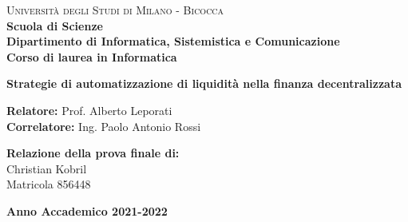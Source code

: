 \documentclass[12pt,a4paper]{report}
\begin{document}
\begin{titlepage}
        
        \noindent
        \begin{minipage}[t]{0.19\textwidth}
        \end{minipage}
        \begin{minipage}[t]{0.81\textwidth}
        {
                {\textsc{Università degli Studi di Milano - Bicocca}} \\
                \textbf{Scuola di Scienze} \\
                \textbf{Dipartimento di Informatica, Sistemistica e Comunicazione} \\
                \textbf{Corso di laurea in Informatica} \\
                \par
        }
        \end{minipage}
        
	\vspace{40mm}
        
	\begin{center}
            {\LARGE{
                    \textbf{Strategie di automatizzazione di liquidità nella finanza decentralizzata}
                    \par
            }}
        \end{center}
        
        \vspace{40mm}

        \noindent
        {\large \textbf{Relatore:} Prof. Alberto Leporati } \\
        
         \noindent
        {\large \textbf{Correlatore:} Ing. Paolo Antonio Rossi}
        
        \vspace{15mm}

        \begin{flushright}
            {\large \textbf{Relazione della prova finale di:}} \\
            \large{Christian Kobril} \\
            \large{Matricola 856448} 
        \end{flushright}
        
        \vspace{40mm}
        \begin{center}
            {\large{\bf Anno Accademico 2021-2022}}
        \end{center}

        \restoregeometry
        
    \end{titlepage}
\end{document}
